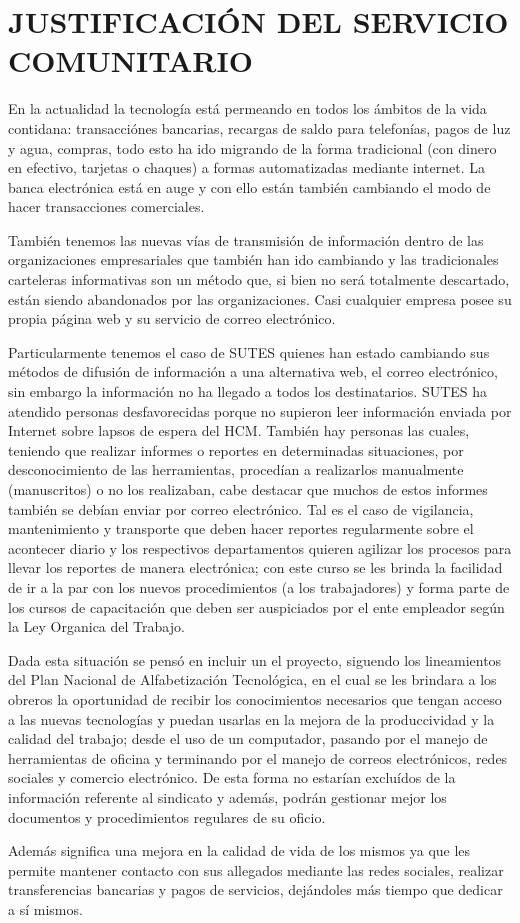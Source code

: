 \chapter{JUSTIFICACIÓN DEL SERVICIO COMUNITARIO}
        En la actualidad la tecnología está permeando en todos los ámbitos de la vida contidana: transacciónes bancarias, recargas de saldo para telefonías, pagos de luz y agua, compras, todo esto ha ido migrando de la forma tradicional (con dinero en efectivo, tarjetas o chaques) a formas automatizadas mediante internet. La banca electrónica está en auge y con ello están también cambiando el modo de hacer transacciones comerciales.
        
        También tenemos las nuevas vías de transmisión de información dentro de las organizaciones empresariales que también han ido cambiando y las tradicionales carteleras informativas son un método que, si bien no será totalmente descartado, están siendo abandonados por las organizaciones. Casi cualquier empresa posee su propia página web y su servicio de correo electrónico.

		Particularmente tenemos el caso de SUTES quienes han estado cambiando sus métodos de difusión de información a una alternativa web, el correo electrónico, sin embargo la información no ha llegado a todos los destinatarios. SUTES ha atendido personas desfavorecidas porque no supieron leer información enviada por Internet sobre lapsos de espera del HCM. También hay personas las cuales, teniendo que realizar informes o reportes en determinadas situaciones, por desconocimiento de las herramientas, procedían a realizarlos manualmente (manuscritos) o no los realizaban, cabe destacar que muchos de estos informes también se debían enviar por correo electrónico. Tal es el caso de vigilancia, mantenimiento y transporte que deben hacer reportes regularmente sobre el acontecer diario y los respectivos departamentos quieren agilizar los procesos para llevar los reportes de manera electrónica; con este curso se les brinda la facilidad de ir a la par con los nuevos procedimientos (a los trabajadores) y forma parte de los cursos de capacitación que deben ser auspiciados por el ente empleador según la Ley Organica del Trabajo.
        
        Dada esta situación se pensó en incluir un el proyecto, siguendo los lineamientos del Plan Nacional de Alfabetización Tecnológica, en el cual se les brindara a los obreros la oportunidad de recibir los conocimientos necesarios que tengan acceso a las nuevas tecnologías y puedan usarlas en la mejora de la produccividad y la calidad del trabajo; desde el uso de un computador, pasando por el manejo de herramientas de oficina y terminando por el manejo de correos electrónicos, redes sociales y comercio electrónico. De esta forma no estarían excluídos de la información referente al sindicato y además, podrán gestionar mejor los documentos y procedimientos regulares de su oficio.
        
        Además significa una mejora en la calidad de vida de los mismos ya que les permite mantener contacto con sus allegados mediante las redes sociales, realizar transferencias bancarias y pagos de servicios, dejándoles más tiempo que dedicar a sí mismos.
	\pagebreak